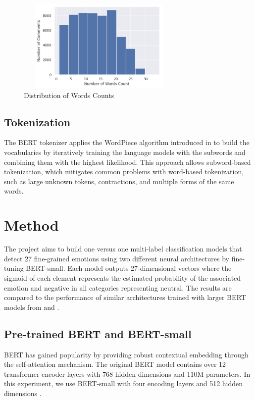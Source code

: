 \documentclass[conference]{IEEEtran}
\begin{document}
\begin{figure}[htbp]
\centerline{\includegraphics[width=8cm, height=4.5cm]{fig/word-count-per-corpus.png} }
\caption{Distribution of Words Counts}
\label{fig}
\end{figure}

\subsection{Tokenization}
The BERT tokenizer applies the WordPiece algorithm introduced in \cite{DBLP:journals/corr/abs-1810-04805}\cite{DBLP:journals/corr/WuSCLNMKCGMKSJL16} to build the vocabularies by iteratively training the language models with the subwords and combining them with the highest likelihood. This approach allows subword-based tokenization, which mitigates common problems with word-based tokenization, such as large unknown tokens, contractions, and multiple forms of the same words. 

\section{Method}
The project aims to build one versus one multi-label classification models that detect 27 fine-grained emotions using two different neural architectures by fine-tuning BERT-small\cite{bhargava2021generalization}\cite{DBLP:journals/corr/abs-1908-08962}. Each model outputs 27-dimensional vectors where the sigmoid of each element represents the estimated probability of the associated emotion and negative in all categories representing neutral. The results are compared to the performance of similar architectures trained with larger BERT models from \cite{DBLP:journals/corr/abs-2005-00547} and \cite{https://doi.org/10.48550/arxiv.2109.01900}.  

\subsection{Pre-trained BERT and BERT-small}
BERT\cite{DBLP:journals/corr/abs-1810-04805} has gained popularity by providing robust contextual embedding through the self-attention mechanism\cite {DBLP:journals/corr/VaswaniSPUJGKP17}. The original BERT model contains over 12 transformer encoder layers with 768 hidden dimensions and 110M parameters. In this experiment, we use BERT-small with four encoding layers and 512 hidden dimensions \cite{bhargava2021generalization}\cite{DBLP:journals/corr/abs-1908-08962}.
\end{document}
